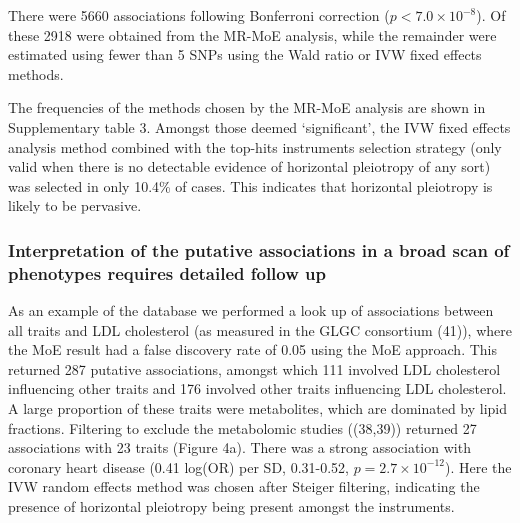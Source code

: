 \documentclass[]{article}
\begin{document}
There were 5660 associations following Bonferroni correction
(\(p < 7.0 \times 10^{-8}\)). Of these 2918 were obtained from the
MR-MoE analysis, while the remainder were estimated using fewer than 5
SNPs using the Wald ratio or IVW fixed effects methods.

The frequencies of the methods chosen by the MR-MoE analysis are shown
in Supplementary table 3. Amongst those deemed `significant', the IVW
fixed effects analysis method combined with the top-hits instruments
selection strategy (only valid when there is no detectable evidence of
horizontal pleiotropy of any sort) was selected in only 10.4\% of cases.
This indicates that horizontal pleiotropy is likely to be pervasive.

\subsubsection{Interpretation of the putative associations in a broad
scan of phenotypes requires detailed follow
up}\label{interpretation-of-the-putative-associations-in-a-broad-scan-of-phenotypes-requires-detailed-follow-up}

As an example of the database we performed a look up of associations
between all traits and LDL cholesterol (as measured in the GLGC
consortium (41)), where the MoE result had a false discovery rate of
0.05 using the MoE approach. This returned 287 putative associations,
amongst which 111 involved LDL cholesterol influencing other traits and
176 involved other traits influencing LDL cholesterol. A large
proportion of these traits were metabolites, which are dominated by
lipid fractions. Filtering to exclude the metabolomic studies ((38,39))
returned 27 associations with 23 traits (Figure 4a). There was a strong
association with coronary heart disease (0.41 log(OR) per SD, 0.31-0.52,
\(p=2.7\times10^{-12}\)). Here the IVW random effects method was chosen
after Steiger filtering, indicating the presence of horizontal
pleiotropy being present amongst the instruments.
\end{document}
